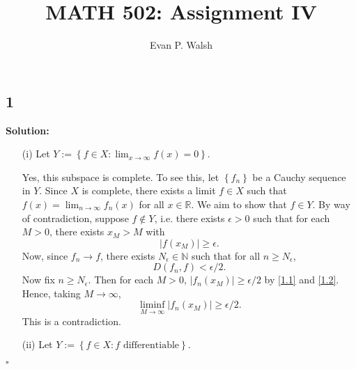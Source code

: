\documentclass[12pt]{article}
\title{MATH 502: Assignment IV}
\author{Evan P. Walsh}
\newcounter{ProofCounter}
\newenvironment{Solution}{\stepcounter{ProofCounter}\textbf{Solution:}}{\hfill$\square$}
\begin{document}
\maketitle

\subsection*{1}
\begin{Solution}
  \begin{enumerate}
    \item[(i)] Let $Y := \left\{ f \in X : \lim_{x\rightarrow \infty}f(x) = 0 \right\}$.

      Yes, this subspace is complete. To see this, let $\left\{ f_{n} \right\}$ be a Cauchy sequence in $Y$. Since $X$ is complete, there exists a limit $f
      \in X$ such that $f(x) = \lim_{n\rightarrow \infty}f_{n}(x)$ for all $x \in \mathbb{R}$. We aim to show that $f \in Y$. By way of contradiction,
      suppose $f \notin Y$, i.e. there exists $\epsilon > 0$ such that for each $M > 0$, there exists $x_{M} > M$ with 
      \begin{equation}
        |f(x_{M})| \geq \epsilon.
        \label{1.1}
      \end{equation}
      Now, since $f_{n} \rightarrow f$, there exists $N_{\epsilon} \in \mathbb{N}$ such that for all $n \geq N_{\epsilon}$, 
      \begin{equation}
        D(f_n, f) < \epsilon /2.
        \label{1.2}
      \end{equation}
      Now fix $n \geq N_{\epsilon}$. Then for each $M > 0$, $|f_{n}(x_{M})|\geq \epsilon / 2$ by \eqref{1.1} and \eqref{1.2}. Hence, taking
      $M \rightarrow \infty$, 
      \[
        \liminf_{M\rightarrow\infty} |f_{n}(x_{M})| \geq \epsilon / 2.
      \]
      This is a contradiction.

    \item[(ii)] Let $Y := \left\{ f\in X : f \text{ differentiable} \right\}$.


\end{enumerate}
\end{Solution}
\end{document}
